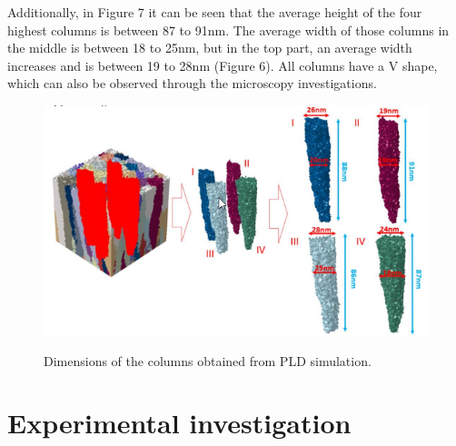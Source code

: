 \documentclass[journal,article,submit,pdftex,moreauthors]{Definitions/mdpi}
\begin{document}
Additionally, in Figure 7 it can be seen that the average height of the four highest columns is between 87 to 91nm. The average width of those columns in the middle is between 18 to 25nm, but in the top part, an average width increases and is between 19 to 28nm (Figure 6). All columns have a V shape, which can also be observed through the microscopy investigations.
 
\begin{figure}[H]
  \captionsetup{justification=centering}
  \centering
  \includegraphics{Definitions/picture7.png}
  \label{fig:obraz7}
    \caption{Dimensions of the columns obtained from PLD simulation.}
\end{figure}   
 
\section{Experimental investigation}
 
\end{document}
